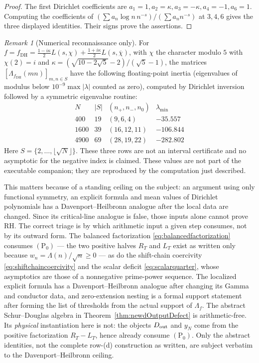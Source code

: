 \documentclass[11pt]{amsart}
\theoremstyle{definition}
\theoremstyle{remark}
\newtheorem{remark}[theorem]{Remark}
\newcommand{\RH}{\mathrm{RH}}
\begin{document}
\begin{proof}
The first Dirichlet coefficients are
$a_1=1,a_2=\kappa,a_3=-\kappa,a_4=-1,a_6=1$.  Computing the coefficients of
$(\sum a_n\log n\,n^{-s})/(\sum a_nn^{-s})$ at $3,4,6$ gives the three
displayed identities.  Their signs prove the assertions.
\end{proof}

\begin{remark}[Numerical reconnaissance only]
For $f=f_{\mathrm{DH}}=\frac{1-i\kappa}2L(s,\chi)+\frac{1+i\kappa}2
L(s,\overline\chi)$, with $\chi$ the character modulo $5$ with
$\chi(2)=i$ and $\kappa=(\sqrt{10-2\sqrt5}-2)/(\sqrt5-1)$, the matrices
$[\Lambda_{f_{\mathrm{DH}}}(mn)]_{m,n\in S}$ have the following
floating-point inertia (eigenvalues of modulus below
$10^{-9}\max|\lambda|$ counted as zero), computed by Dirichlet inversion
followed by a symmetric eigenvalue routine:
\[
\begin{array}{c|c|c|c}
N&|S|&(n_+,n_-,n_0)&\lambda_{\min}\\ \hline
 400 &19&(9,6,4)&-35.557\\
1600 &39&(16,12,11)&-106.844\\
4900 &69&(28,19,22)&-282.802
\end{array}
\]
Here $S=\{2,\dots,\lfloor\sqrt N\rfloor\}$.  These three rows are not an
interval certificate and no asymptotic for the negative index is claimed.
These values are not part of the executable companion; they are reproduced
by the computation just described.
\end{remark}

This matters because of a standing ceiling on the subject: an argument using
only functional symmetry, an explicit formula and mean values of Dirichlet
polynomials has a Davenport--Heilbronn analogue after the local data are
changed.  Since its critical-line analogue is false, those inputs alone
cannot prove $\RH$.  The correct triage is by which arithmetic input a given
step consumes, not by its outward form.  The balanced factorization
\eqref{eq:balancedfactorization} consumes $\mathrm{(P_0)}$ --- the two
positive halves $R_T$ and $L_T$ exist as written only because
$w_n=\Lambda(n)/\sqrt n\ge0$ --- as do the shift-chain coercivity
\eqref{eq:shiftchaincoercivity} and the scalar deficit
\eqref{eq:scalarquarter}, whose asymptotics are those of a nonnegative
prime-power sequence.  The localized explicit formula has a
Davenport--Heilbronn analogue after changing its Gamma and conductor data,
and zero-extension nesting is a formal support statement after forming
the list of thresholds from the actual support of $\Lambda_f$.  The abstract
Schur--Douglas algebra in Theorem~\ref{thm:newdOutputDefect} is
arithmetic-free.  Its \emph{physical} instantiation here is not: the objects
$D_{\rm out}$ and $y_N$ come from the positive factorization $R_T-L_T$, hence
already consume $\mathrm{(P_0)}$.  Only the abstract identities, not the
complete row-(d) construction as written, are subject verbatim to the
Davenport--Heilbronn ceiling.
\end{document}
